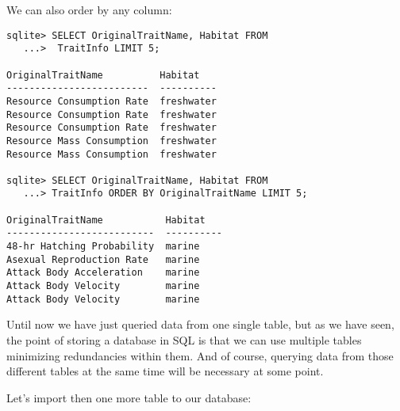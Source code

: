 We can also order by any column:

 \begin{lstlisting}
sqlite> SELECT OriginalTraitName, Habitat FROM 
   ...>  TraitInfo LIMIT 5;

OriginalTraitName          Habitat   
-------------------------  ----------
Resource Consumption Rate  freshwater
Resource Consumption Rate  freshwater
Resource Consumption Rate  freshwater
Resource Mass Consumption  freshwater
Resource Mass Consumption  freshwater

sqlite> SELECT OriginalTraitName, Habitat FROM 
   ...> TraitInfo ORDER BY OriginalTraitName LIMIT 5;

OriginalTraitName           Habitat   
--------------------------  ----------
48-hr Hatching Probability  marine    
Asexual Reproduction Rate   marine    
Attack Body Acceleration    marine    
Attack Body Velocity        marine    
Attack Body Velocity        marine  
 \end{lstlisting}


 Until now we have just queried data from one single table, but as we have seen,
 the point of storing a database in SQL is that we can use multiple tables minimizing
 redundancies within them. And of course, querying data from those different tables at
 the same time will be necessary at some point.

 Let's import then one more table to our database:

